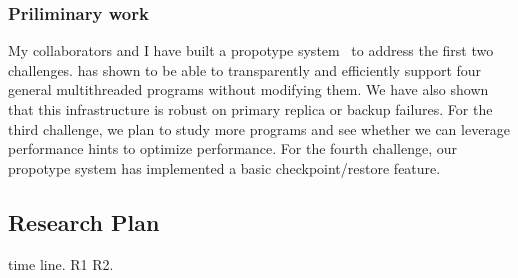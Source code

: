 
\subsubsection{Priliminary work} \label{sec:defense-result}

My collaborators and I have built a propotype system~\cite{crane:sosp15} to 
address the first two challenges. \crane has shown to be able to transparently 
and efficiently support four general multithreaded programs without modifying 
them. We have also shown that this infrastructure is robust on primary replica 
or backup failures. For the third challenge, we plan to study more 
programs and see whether we can leverage performance hints to optimize 
performance. For the fourth challenge, our propotype system \crane has 
implemented a basic checkpoint/restore feature.

\subsection{Research Plan} \label{sec:rep}
time line. R1 R2.


